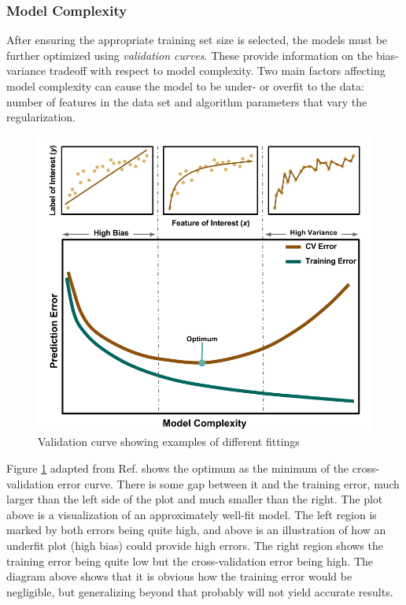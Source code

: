 \subsubsection{Model Complexity}

After ensuring the appropriate training set size is selected, the models must
be further optimized using \textit{validation curves}.  These provide
information on the bias-variance tradeoff with respect to model complexity. Two
main factors affecting model complexity can cause the model to be under- or
overfit to the data: number of features in the data set and algorithm
parameters that vary the regularization.

\begin{figure}[!htb]
  \centering
  \includegraphics[width=1.05\linewidth]{./chapters/litrev/ValidationCurve.png}
  \caption{Validation curve showing examples of different fittings}
  \label{fig:validation}
\end{figure}

Figure \ref{fig:validation} adapted from Ref. \cite{elements_stats} shows the
optimum as the minimum of the cross-validation error curve. There is some gap
between it and the training error, much larger than the left side of the plot
and much smaller than the right.  The plot above is a visualization of an
approximately well-fit model.  The left region is marked by both errors being
quite high, and above is an  illustration of how an underfit plot (high bias)
could provide high errors. The right region shows the training error being
quite low but the cross-validation error being high. The diagram above shows
that it is obvious how the training error would be negligible, but generalizing
beyond that probably will not yield accurate results. 

